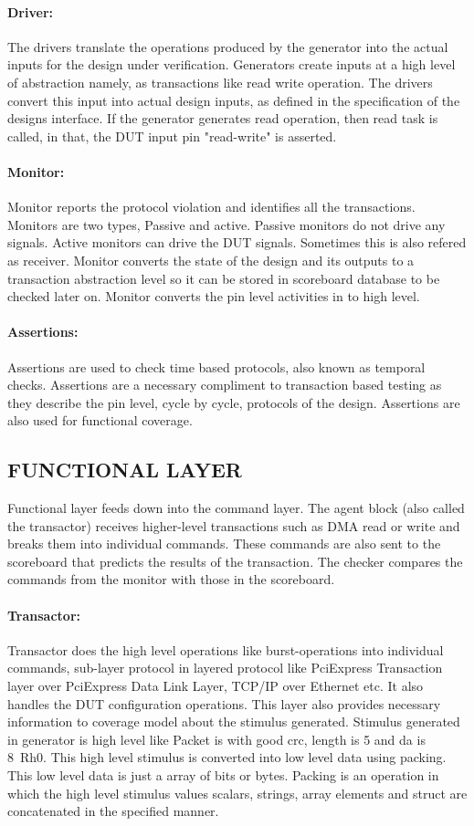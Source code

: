 \paragraph{Driver:} The drivers translate the operations produced by the generator into the actual inputs for the design under verification. Generators create inputs at a high level of abstraction namely, as transactions like read write operation. The drivers convert this input into actual design inputs, as defined in the specification of the designs interface. If the generator generates read operation, then read task is called, in that, the DUT input pin "read-write" is asserted.
\paragraph{Monitor:} Monitor reports the protocol violation and identifies all the transactions. Monitors are two types, Passive and active. Passive monitors do not drive any signals. Active monitors can drive the DUT signals. Sometimes this is also refered as receiver. Monitor converts the state of the design and its outputs to a transaction abstraction level so it can be stored in scoreboard database to be checked later on. Monitor converts the pin level activities in to high level.
\paragraph{Assertions:} Assertions are used to check time based protocols, also known as temporal checks. Assertions are a necessary compliment to transaction based testing as they describe the pin level, cycle by cycle, protocols of the design. Assertions are also used for functional coverage. 

\subsection{FUNCTIONAL LAYER}
Functional layer feeds down into the command layer. The agent block (also called the transactor) receives higher-level transactions such as DMA read or write and breaks them into individual commands. These commands are also sent to the scoreboard that predicts the results of the transaction. The checker compares the commands from the monitor with those
in the scoreboard.
\paragraph{Transactor:} Transactor does the high level operations like burst-operations into individual commands, sub-layer protocol in layered protocol like PciExpress Transaction layer over PciExpress Data Link Layer, TCP/IP over Ethernet etc. It also handles the DUT configuration operations. This layer also provides necessary information to coverage model about the stimulus generated. Stimulus generated in generator is high level like Packet is with good crc, length is 5 and da is 8~Rh0. This high level stimulus is converted into low level data using packing. This low level data is just a array of bits or bytes. Packing is an operation in which the high level stimulus values scalars, strings, array elements and struct are concatenated in the specified manner.
